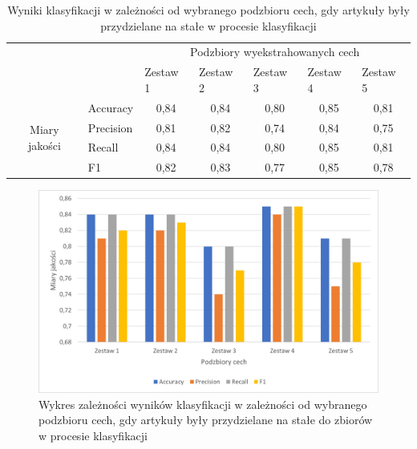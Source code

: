 \documentclass{classrep}
\begin{document}
\begin{table}[!htbp]
\caption{Wyniki klasyfikacji w zależności od wybranego podzbioru cech, gdy artykuły były przydzielane na stałe w procesie klasyfikacji}
\centering
\label{table:podzbiory}
\begin{tabular}{cl|c|c|c|c|c|}
\cline{3-7}
\multicolumn{1}{l}{}                                 &           & \multicolumn{5}{c|}{Podzbiory wyekstrahowanych cech}                                                                                                          \\ \cline{3-7} 
\multicolumn{1}{l}{}                                 &           & \multicolumn{1}{l|}{Zestaw 1} & \multicolumn{1}{l|}{Zestaw 2} & \multicolumn{1}{l|}{Zestaw 3} & \multicolumn{1}{l|}{Zestaw 4} & \multicolumn{1}{l|}{Zestaw 5} \\ \hline
\multicolumn{1}{|c|}{\multirow{4}{*}{Miary jakości}} & Accuracy  & 0,84                          & 0,84                          & 0,80                          & 0,85                          & 0,81                          \\ \cline{2-7} 
\multicolumn{1}{|c|}{}                               & Precision & 0,81                          & 0,82                          & 0,74                          & 0,84                          & 0,75                          \\ \cline{2-7} 
\multicolumn{1}{|c|}{}                               & Recall    & 0,84                          & 0,84                          & 0,80                          & 0,85                          & 0,81                          \\ \cline{2-7} 
\multicolumn{1}{|c|}{}                               & F1        & 0,82                          & 0,83                          & 0,77                          & 0,85                          & 0,78                          \\ \hline
\end{tabular}
\end{table}
\begin{figure}[H]
    \centering
    \includegraphics[width=14cm]{features_const_bar_chart.png}
    \caption{Wykres zależności wyników klasyfikacji w zależności od wybranego podzbioru cech, gdy artykuły były przydzielane na stałe do zbiorów w procesie klasyfikacji}
    \label{rysunek:podzbiory_stale}
\end{figure}
\end{document}
